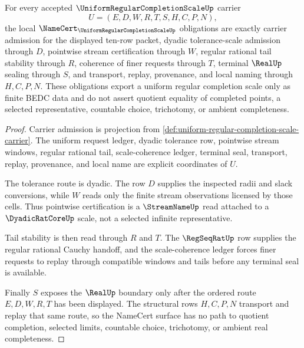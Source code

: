 \begin{theorem}
\label{thm:uniform-regular-completion-scale-namecert-obligations}
For every accepted $\UniformRegularCompletionScaleUp$ carrier
$$
U=(E,D,W,R,T,S,H,C,P,N),
$$
the local $\NameCert_{\UniformRegularCompletionScaleUp}$ obligations are exactly carrier admission for the displayed ten-row packet, dyadic tolerance-scale admission through $D$, pointwise stream certification through $W$, regular rational tail stability through $R$, coherence of finer requests through $T$, terminal $\RealUp$ sealing through $S$, and transport, replay, provenance, and local naming through $H,C,P,N$. These obligations export a uniform regular completion scale only as finite BEDC data and do not assert quotient equality of completed points, a selected representative, countable choice, trichotomy, or ambient completeness.
\end{theorem}
\begin{proof}
Carrier admission is projection from \autoref{def:uniform-regular-completion-scale-carrier}. The uniform request ledger, dyadic tolerance row, pointwise stream windows, regular rational tail, scale-coherence ledger, terminal seal, transport, replay, provenance, and local name are explicit coordinates of $U$.

The tolerance route is dyadic. The row $D$ supplies the inspected radii and slack conversions, while $W$ reads only the finite stream observations licensed by those cells. Thus pointwise certification is a $\StreamNameUp$ read attached to a $\DyadicRatCoreUp$ scale, not a selected infinite representative.

Tail stability is then read through $R$ and $T$. The $\RegSeqRatUp$ row supplies the regular rational Cauchy handoff, and the scale-coherence ledger forces finer requests to replay through compatible windows and tails before any terminal seal is available.

Finally $S$ exposes the $\RealUp$ boundary only after the ordered route $E,D,W,R,T$ has been displayed. The structural rows $H,C,P,N$ transport and replay that same route, so the NameCert surface has no path to quotient completion, selected limits, countable choice, trichotomy, or ambient real completeness.
\end{proof}



